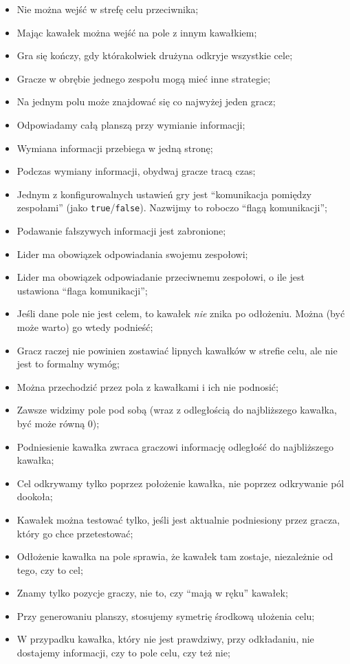 \documentclass[a4paper]{article}
\begin{document}
\begin{itemize}
\item
  Nie można wejść w strefę celu przeciwnika;
\item
  Mając kawałek można wejść na pole z innym kawałkiem;
\item
  Gra się kończy, gdy którakolwiek drużyna odkryje wszystkie cele;
\item
  Gracze w obrębie jednego zespołu mogą mieć inne strategie;
\item
  Na jednym polu może znajdować się co najwyżej jeden gracz;
\item
  Odpowiadamy całą planszą przy wymianie informacji;
\item
  Wymiana informacji przebiega w jedną stronę;
\item
  Podczas wymiany informacji, obydwaj gracze tracą czas;
\item
  Jednym z konfigurowalnych ustawień gry jest ``komunikacja pomiędzy zespołami'' (jako \texttt{true}/\texttt{false}). Nazwijmy to roboczo ``flagą komunikacji'';
\item
  Podawanie fałszywych informacji jest zabronione;
\item
  Lider ma obowiązek odpowiadania swojemu zespołowi;
\item
  Lider ma obowiązek odpowiadanie przeciwnemu zespołowi, o ile jest ustawiona ``flaga komunikacji'';
\item
  Jeśli dane pole nie jest celem, to kawałek \emph{nie} znika po odłożeniu. Można (być może warto) go wtedy podnieść;
\item
  Gracz raczej nie powinien zostawiać lipnych kawałków w strefie celu, ale nie jest to formalny wymóg;
\item
  Można przechodzić przez pola z kawałkami i ich nie podnosić;
\item
  Zawsze widzimy pole pod sobą (wraz z odległością do najbliższego kawałka, być może równą 0);
\item
  Podniesienie kawałka zwraca graczowi informację odległość do najbliższego kawałka;
\item
  Cel odkrywamy tylko poprzez położenie kawałka, nie poprzez odkrywanie pól dookoła;
\item
  Kawałek można testować tylko, jeśli jest aktualnie podniesiony przez gracza, który go chce przetestować;
\item
  Odłożenie kawałka na pole sprawia, że kawałek tam zostaje, niezależnie od tego, czy to cel;
\item
  Znamy tylko pozycje graczy, nie to, czy ``mają w ręku'' kawałek;
\item
  Przy generowaniu planszy, stosujemy symetrię środkową ułożenia celu;
\item
  W przypadku kawałka, który nie jest prawdziwy, przy odkładaniu, nie dostajemy informacji, czy to pole celu, czy też nie;


\end{itemize}
\end{document}
